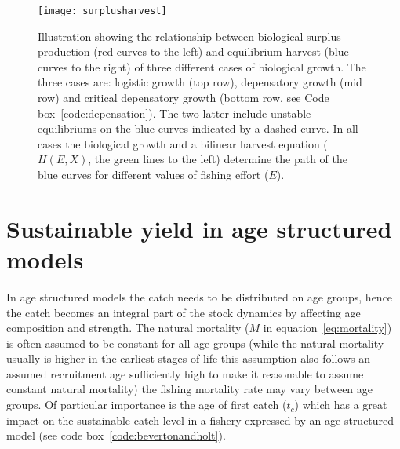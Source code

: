 \documentclass[11pt,fleqn]{book} %
\begin{document}
\begin{figure}[ht]
\centering\texttt{[image: surplusharvest]}
\caption{Illustration showing the relationship between biological surplus production (red curves to the left) and equilibrium harvest (blue curves to the right) of three different cases of biological growth. The three cases are: logistic growth (top row), depensatory growth (mid row) and critical depensatory growth (bottom row, see Code box~\ref{code:depensation}). The two latter include unstable equilibriums on the blue curves indicated by a dashed curve. In all cases the biological growth and a bilinear harvest equation ($H(E,X)$, the green lines to the left) determine the path of the blue curves for different values of fishing effort ($E$).}
\label{fig:surplusharvest}
\end{figure}
\begin{figure}[!htb]
\end{figure}

\section{Sustainable yield in age structured models}\label{agestructuredF}
In age structured models the catch needs to be distributed on age groups, hence the catch becomes an integral part of the stock dynamics by affecting age composition and strength. The natural mortality ($M$ in equation~\ref{eq:mortality}) is often assumed to be constant for all age groups (while the natural mortality usually is higher in the earliest stages of life this assumption also follows an assumed recruitment age sufficiently high to make it reasonable to assume constant natural mortality) the fishing mortality rate may vary between age groups. Of particular importance is the age of first catch ($t_c$) which has a great impact on the sustainable catch level in a fishery expressed by an age structured model (see code box~\ref{code:bevertonandholt}).
\end{document}
